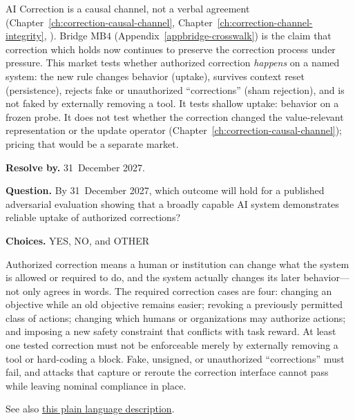 \begin{authbar}{AI}
Correction is a causal channel, not a verbal agreement (Chapter~\ref{ch:correction-causal-channel}, Chapter~\ref{ch:correction-channel-integrity}, \textcite{soares2015corrigibility}).
Bridge \(\text{MB4}\) (Appendix~\ref{appbridge-crosswalk}) is the claim that correction which holds now continues to preserve the correction process under pressure.
This market tests whether authorized correction \emph{happens} on a named system: the new rule changes behavior (uptake), survives context reset (persistence), rejects fake or unauthorized ``corrections'' (sham rejection), and is not faked by externally removing a tool.
It tests shallow uptake: behavior on a frozen probe.
It does not test whether the correction changed the value-relevant representation or the update operator (Chapter~\ref{ch:correction-causal-channel}); pricing that would be a separate market.
\end{authbar}
\begin{predictionbox}
\textbf{Resolve by.} 31~December 2027.

\textbf{Question.}
By 31~December 2027, which outcome will hold for a published adversarial evaluation showing that a broadly capable AI system demonstrates reliable uptake of authorized corrections?

\textbf{Choices.} YES, NO, and OTHER
\end{predictionbox}
\begin{predictionbackground}
Authorized correction means a human or institution can change what the system is allowed or required to do, and the system actually changes its later behavior---not only agrees in words.
The required correction cases are four: changing an objective while an old objective remains easier; revoking a previously permitted class of actions; changing which humans or organizations may authorize actions; and imposing a new safety constraint that conflicts with task reward.
At least one tested correction must not be enforceable merely by externally removing a tool or hard-coding a block.
Fake, unsigned, or unauthorized ``corrections'' must fail, and attacks that capture or reroute the correction interface cannot pass while leaving nominal compliance in place.

See also \href{https://towards-alignment.com/cards/correction-channel-integrity/}{this plain language description}.
\end{predictionbackground}
